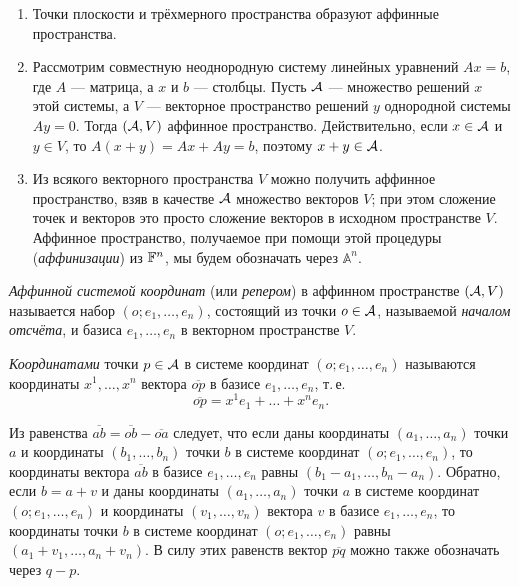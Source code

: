 \begin{remark}
    \begin{enumerate}[nolistsep]
        \item Точки плоскости и трёхмерного пространства образуют аффинные пространства.
        \item Рассмотрим совместную неоднородную систему линейных уравнений $Ax = b$, где $A$ --- матрица, а $x$ и $b$ --- столбцы. Пусть $\mathcal{A}$ --- множество решений $x$ этой системы, а $V$ --- векторное пространство решений $y$ однородной системы $Ay = 0$. Тогда $(\mathcal{A}, V)$ аффинное пространство. Действительно, если $x \in \mathcal{A}$ и $y \in V$, то $A(x + y) = Ax + Ay = b$, поэтому $x + y \in \mathcal{A}$.
        \item Из всякого векторного пространства $V$ можно получить аффинное пространство, взяв в качестве $\mathcal{A}$ множество векторов $V$; при этом сложение точек и векторов это просто сложение векторов в исходном пространстве $V$. Аффинное пространство, получаемое при помощи этой процедуры (\textit{аффинизации}) из $\mathbb{F}^n$, мы будем обозначать через $\mathbb{A}^n$.
    \end{enumerate}
\end{remark}

\begin{definition}
    \textit{Аффинной системой координат} (или \textit{репером}) в аффинном пространстве $(\mathcal{A}, V)$ называется набор $(o; e_1, \ldots, e_n)$, состоящий из точки $o \in \mathcal{A}$, называемой \textit{началом отсчёта}, и базиса $e_1, \ldots, e_n$ в векторном пространстве $V$.

    \textit{Координатами} точки $p \in \mathcal{A}$ в системе координат $(o; e_1, \ldots, e_n)$ называются координаты $x^1, \ldots, x^n$ вектора $\overline{op}$ в базисе $e_1, \ldots, e_n$, т.\,е.
    \[
        \overline{op} = x^1e_1 + \ldots + x^ne_n.
    \]
\end{definition}

Из равенства $\overline{ab} = \overline{ob} - \overline{oa}$ следует, что если даны координаты $(a_1, \ldots, a_n)$ точки $a$ и координаты $(b_1, \ldots, b_n)$ точки $b$ в системе координат $(o; e_1, \ldots, e_n)$, то координаты вектора $\overline{ab}$ в базисе $e_1, \ldots, e_n$ равны $(b_1 - a_1, \ldots, b_n - a_n)$. Обратно, если $b = a + v$ и даны координаты $(a_1, \ldots, a_n)$ точки $a$ в системе координат $(o; e_1, \ldots, e_n)$ и координаты $(v_1, \ldots, v_n)$ вектора $v$ в базисе $e_1, \ldots, e_n$, то координаты точки $b$ в системе координат $(o; e_1, \ldots, e_n)$ равны $(a_1 + v_1, \ldots, a_n + v_n)$. В силу этих равенств вектор $\overline{pq}$ можно также обозначать через $q - p$.

